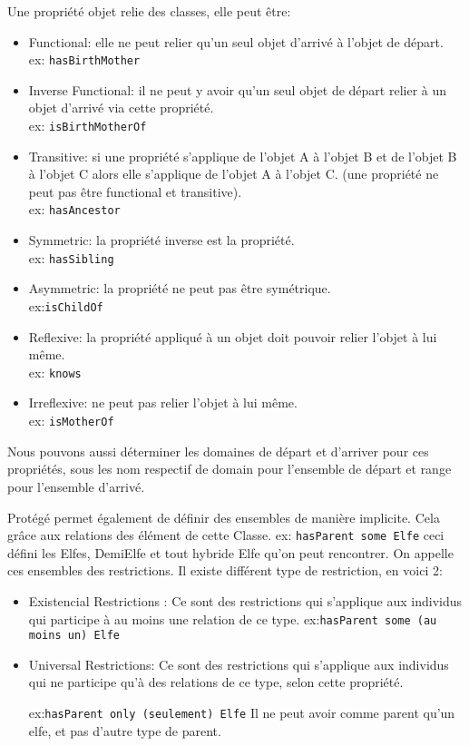 Une propriété objet relie des classes, elle peut être:
\begin{itemize}
\item Functional: elle ne peut relier qu'un seul objet d'arrivé à l'objet de départ.\\
  ex: \texttt{hasBirthMother}
\item Inverse Functional: il ne peut y avoir qu'un seul objet de départ relier à un objet d'arrivé via cette propriété.\\
  ex: \texttt{isBirthMotherOf}
\item Transitive: si une propriété s'applique de l'objet A à l'objet B et de l'objet B à l'objet C alors elle s'applique de l'objet A à l'objet C. (une propriété ne peut pas être  functional et transitive).\\
  ex: \texttt{hasAncestor}
\item Symmetric: la propriété inverse est la propriété.\\
  ex: \texttt{hasSibling}
\item Asymmetric: la propriété ne peut pas être symétrique.\\
  ex:\texttt{isChildOf}
\item Reflexive: la propriété appliqué à un objet doit pouvoir relier l'objet à lui même.\\
  ex: \texttt{knows}
\item Irreflexive: ne peut pas relier l'objet à lui même.\\
  ex: \texttt{isMotherOf}
  
\end{itemize}
\par Nous pouvons aussi déterminer les domaines de départ et d'arriver pour ces propriétés, sous les nom respectif de domain pour l'ensemble de départ et range pour l'ensemble d'arrivé.
\par Protégé permet également de définir des ensembles de manière implicite. Cela grâce aux relations des élément de cette Classe.
ex: \texttt{hasParent some Elfe} ceci défini les Elfes, DemiElfe et tout hybride Elfe qu'on peut rencontrer.
On appelle ces ensembles des restrictions. Il existe différent type de restriction, en voici 2:
\begin{itemize}
\item Existencial Restrictions : Ce sont des restrictions qui s'applique aux individus qui participe à au moins une relation de ce type.
  ex:\texttt{hasParent some (au moins un) Elfe}
\item Universal Restrictions: Ce sont des restrictions qui s'applique aux individus qui ne participe qu'à des relations de ce type, selon cette propriété.
  
  ex:\texttt{hasParent only (seulement) Elfe} 
  Il ne peut avoir comme parent qu'un elfe, et pas d'autre type de parent.
  
\end{itemize}

